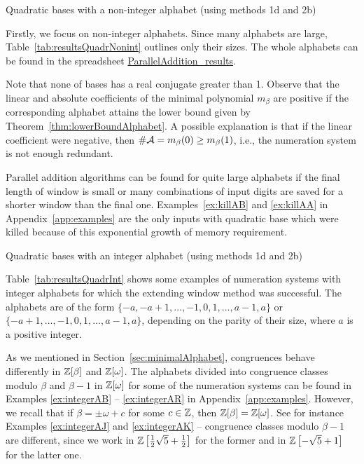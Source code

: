 \begin{table}[tpb]
	\begin{center}
	
	\end{center}
\caption{Quadratic bases with a non-integer alphabet (using methods 1d and 2b)}
\label{tab:resultsQuadrNonint}
\end{table}

Firstly, we focus on non-integer alphabets. Since many alphabets are large, Table~\ref{tab:resultsQuadrNonint} outlines only their sizes. The whole alphabets can be found in the spreadsheet \href{https://docs.google.com/spreadsheets/d/1TnhrHdefHfHa0WSeVs4q6XVj3epjPlPlnoekE0E1xeM/edit?usp=sharing}{ParallelAddition\_results}.

Note that none of bases has a real conjugate greater than 1. Observe that the linear and absolute coefficients of the minimal polynomial $m_\beta$ are positive if the corresponding alphabet attains the lower bound given by Theorem~\ref{thm:lowerBoundAlphabet}. A possible explanation is that if the linear coefficient were negative, then $\#\mathcal{A}=m_\beta(0)\geq m_\beta(1)$, i.e., the numeration system is not enough redundant.

Parallel addition algorithms can be found for quite large alphabets  if the final length of window is small or many combinations of input digits  are saved for a shorter window than the final one. Examples~\ref{ex:killAB} and \ref{ex:killAA} in Appendix~\ref{app:examples} are the only inputs with quadratic base which were killed because of this exponential growth of memory requirement.

 
\begin{table}[htpb]
	\begin{center}
	
	\end{center}
\caption{Quadratic bases with an integer alphabet (using methods 1d and 2b)}
\label{tab:resultsQuadrInt}
\end{table}

Table~\ref{tab:resultsQuadrInt} shows some examples of numeration systems with integer alphabets for which the extending window method was successful. The alphabets are of the form $\{-a, -a+1, \dots, -1,0,1,\dots, a-1,a\}$ or $\{-a+1, \dots, -1,0,1,\dots, a-1,a\}$, depending on the parity of their size, where $a$ is a positive integer.

As we mentioned in Section~\ref{sec:minimalAlphabet}, congruences behave differently in $\mathbb{Z}[\beta]$ and $\mathbb{Z}[\omega]$. The alphabets divided into congruence classes modulo $\beta$ and $\beta-1$ in $\mathbb{Z}[\omega]$ for some of the numeration systems can be found in Examples \ref{ex:integerAB} -- \ref{ex:integerAR} in Appendix~\ref{app:examples}. However, we recall that if $\beta=\pm \omega+c$  for some $c\in\mathbb{Z}$, then $\mathbb{Z}[\beta]=\mathbb{Z}[\omega]$. See for instance Examples \ref{ex:integerAJ} and \ref{ex:integerAK} -- congruence classes modulo $\beta-1$ are different, since we work in $\mathbb{Z}\left[\frac{1}{2} \sqrt{5} + \frac{1}{2}\right]$ for the former and in $\mathbb{Z}\left[-\sqrt{5} + 1\right]$ for the latter one.

